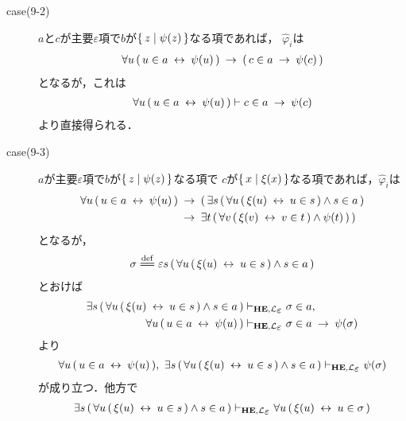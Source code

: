 \begin{metaprf}
\begin{description}
\begin{description}
					\item[case(9-2)] $a$と$c$が主要$\varepsilon$項で$b$が$\{\, z \mid \psi(z)\, \}$なる項であれば，
						$\widehat{\varphi}_{i}$は
						\begin{align}
							\forall u\, (\, u \in a \hspace{0.25em}\leftrightarrow\hspace{0.25em} \psi(u)\, ) 
							\hspace{0.25em}\rightarrow\hspace{0.25em} (\, c \in a \hspace{0.25em}\rightarrow\hspace{0.25em} \psi(c)\, )
						\end{align}
						となるが，これは
						\begin{align}
							\forall u\, (\, u \in a \hspace{0.25em}\leftrightarrow\hspace{0.25em} \psi(u)\, ) \vdash c \in a \hspace{0.25em}\rightarrow\hspace{0.25em} \psi(c)
						\end{align}
						より直接得られる．
						
					\item[case(9-3)] $a$が主要$\varepsilon$項で$b$が$\{\, z \mid \psi(z)\, \}$なる項で
						$c$が$\{\, x \mid \xi(x)\, \}$なる項であれば，$\widehat{\varphi}_{i}$は
						\begin{align}
							\forall u\, (\, u \in a \hspace{0.25em}\leftrightarrow\hspace{0.25em} \psi(u)\, ) 
							&\hspace{0.25em}\rightarrow\hspace{0.25em} (\, \exists s\, (\, \forall u\, (\, \xi(u) \hspace{0.25em}\leftrightarrow\hspace{0.25em} u \in s\, ) \wedge s \in a\, ) \\
							&\hspace{0.25em}\rightarrow\hspace{0.25em} \exists t\, (\, \forall v\, (\, \xi(v) \hspace{0.25em}\leftrightarrow\hspace{0.25em} v \in t\, ) \wedge \psi(t)\, )\, )
						\end{align}
						となるが，
						\begin{align}
							\sigma \defeq \varepsilon s\, (\, \forall u\, (\, \xi(u) \lrarrow u \in s\, ) \wedge s \in a\, )
						\end{align}
						とおけば
						\begin{align}
							\exists s\, (\, \forall u\, (\, \xi(u) \lrarrow u \in s\, ) \wedge s \in a\, ) 
							&\provable{\mbox{{\bf HE}},\lang{\varepsilon}} \sigma \in a, \\
							\forall u\, (\, u \in a \lrarrow \psi(u)\, )
							&\provable{\mbox{{\bf HE}},\lang{\varepsilon}} \sigma \in a \rarrow \psi(\sigma)
						\end{align}
						より
						\begin{align}
							\forall u\, (\, u \in a \lrarrow \psi(u)\, ),\ 
							\exists s\, (\, \forall u\, (\, \xi(u) \lrarrow u \in s\, ) \wedge s \in a\, ) 
							\provable{\mbox{{\bf HE}},\lang{\varepsilon}} \psi(\sigma)
						\end{align}
						が成り立つ．他方で
						\begin{align}
							\exists s\, (\, \forall u\, (\, \xi(u) \lrarrow u \in s\, ) \wedge s \in a\, ) 
							\provable{\mbox{{\bf HE}},\lang{\varepsilon}} \forall u\, (\, \xi(u) \lrarrow u \in \sigma\, )

\end{align}
\end{description}
\end{description}
\end{metaprf}
